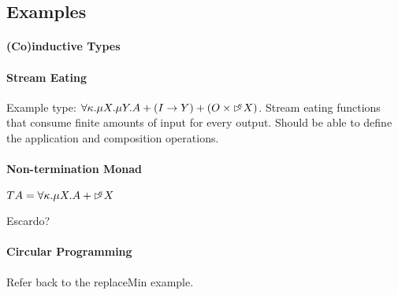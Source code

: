 \subsection{Examples}\label{sec:examples}

\paragraph{(Co)inductive Types}

\paragraph{Stream Eating}

Example type: $\forall \kappa. \mu X. \mu Y. A + (I \to Y) + (O \times
\mathord{\rhd\kern-0.4em^{\kappa}} X)$. Stream eating functions that consume finite amounts
of input for every output. Should be able to define the application
and composition operations.

\paragraph{Non-termination Monad}

$T A = \forall \kappa. \mu X. A + \mathord{\rhd\kern-0.4em^{\kappa}} X$

Escardo?

\paragraph{Circular Programming} Refer back to the replaceMin example.

